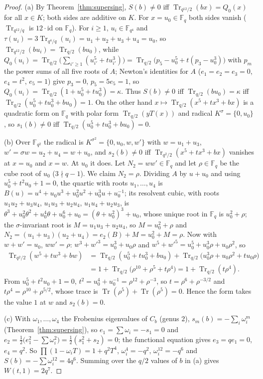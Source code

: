 \documentclass[11pt,a4paper]{amsart}
\theoremstyle{definition}
\newcommand{\F}{\mathbb{F}}
\newcommand{\Tr}{\operatorname{Tr}}
\begin{document}
\begin{proof}
(a) By Theorem~\ref{thm:supersing}, $S(b)\ne0$ iff $\Tr_{q^{12}/2}(bx)=Q_0(x)$ for all $x\in K$; both sides are additive on $K$. For $x=u_0\in\F_q$ both sides vanish ($\Tr_{q^{12}/q}$ is $12\cdot\mathrm{id}$ on $\F_q$). For $i\ge1$, $u_i\in\F_{q^4}$ and $\tau(u_i)=3\Tr_{q^4/q}(u_i)=u_1+u_2+u_3+u_4=u_0$, so $\Tr_{q^{12}/2}(bu_i)=\Tr_{q/2}(bu_0)$, while $Q_0(u_i)=\Tr_{q/2}\bigl(\sum_{i'\ge1}(u_{i'}^5+tu_{i'}^3)\bigr)=\Tr_{q/2}\bigl(p_5-u_0^5+t(p_3-u_0^3)\bigr)$ with $p_m$ the power sums of all five roots of $A$; Newton's identities for $A$ ($e_1=e_2=e_3=0$, $e_4=t^2$, $e_5=1$) give $p_3=0$, $p_5=5e_5=1$, so $Q_0(u_i)=\Tr_{q/2}(1+u_0^5+tu_0^3)=\kappa$. Thus $S(b)\ne0$ iff $\Tr_{q/2}(bu_0)=\kappa$ iff $\Tr_{q/2}(u_0^5+tu_0^3+bu_0)=1$. On the other hand $x\mapsto\Tr_{q/2}(x^5+tx^3+bx)$ is a quadratic form on $\F_q$ with polar form $\Tr_{q/2}(yT(x))$ and radical $K^\sigma=\{0,u_0\}$, so $s_1(b)\ne0$ iff $\Tr_{q/2}(u_0^5+tu_0^3+bu_0)=0$.

(b) Over $\F_{q^2}$ the radical is $K^{\sigma^2}=\{0,u_0,w,w'\}$ with $w=u_1+u_3$, $w'=\sigma w=u_2+u_4=w+u_0$, and $s_2(b)\ne0$ iff $\Tr_{q^2/2}(x^5+tx^3+bx)$ vanishes at $x=u_0$ and $x=w$. At $u_0$ it does. Let $N_2=ww'\in\F_q$ and let $\rho\in\F_q$ be the cube root of $u_0$ ($3\nmid q-1$). We claim $N_2=\rho$. Dividing $A$ by $u+u_0$ and using $u_0^5+t^2u_0+1=0$, the quartic with roots $u_1,\dots,u_4$ is $B(u)=u^4+u_0u^3+u_0^2u^2+u_0^3u+u_0^{-1}$; its resolvent cubic, with roots $u_1u_2+u_3u_4$, $u_1u_3+u_2u_4$, $u_1u_4+u_2u_3$, is $\theta^3+u_0^2\theta^2+u_0^4\theta+u_0^6+u_0=(\theta+u_0^2)^3+u_0$, whose unique root in $\F_q$ is $u_0^2+\rho$; the $\sigma$-invariant root is $M=u_1u_3+u_2u_4$, so $M=u_0^2+\rho$ and $N_2=(u_1+u_3)(u_2+u_4)=e_2(B)+M=u_0^2+M=\rho$. Now with $w+w'=u_0$, $ww'=\rho$: $w^3+w'^3=u_0^3+u_0\rho$ and $w^5+w'^5=u_0^5+u_0^3\rho+u_0\rho^2$, so
\begin{align*}
\Tr_{q^2/2}(w^5+tw^3+bw)&=\Tr_{q/2}(u_0^5+tu_0^3+bu_0)+\Tr_{q/2}\bigl(u_0^3\rho+u_0\rho^2+tu_0\rho\bigr)\\
&=1+\Tr_{q/2}\bigl(\rho^{10}+\rho^5+t\rho^4\bigr)=1+\Tr_{q/2}(t\rho^4).
\end{align*}
From $u_0^5+t^2u_0+1=0$, $t^2=u_0^4+u_0^{-1}=\rho^{12}+\rho^{-3}$, so $t=\rho^6+\rho^{-3/2}$ and $t\rho^4=\rho^{10}+\rho^{5/2}$, whose trace is $\Tr(\rho^5)+\Tr(\rho^5)=0$. Hence the form takes the value $1$ at $w$ and $s_2(b)=0$.

(c) With $\omega_1,\dots,\omega_4$ the Frobenius eigenvalues of $C_b$ (genus $2$), $s_m(b)=-\sum_i\omega_i^m$ (Theorem~\ref{thm:supersing}), so $e_1=\sum\omega_i=-s_1=0$ and $e_2=\frac12\bigl(e_1^2-\sum\omega_i^2\bigr)=\frac12(s_1^2+s_2)=0$; the functional equation gives $e_3=qe_1=0$, $e_4=q^2$. So $\prod(1-\omega_iT)=1+q^2T^4$, $\omega_i^4=-q^2$, $\omega_i^{12}=-q^6$ and $S(b)=-\sum\omega_i^{12}=4q^6$. Summing over the $q/2$ values of $b$ in (a) gives $W(t,1)=2q^7$.
\end{proof}
\end{document}
